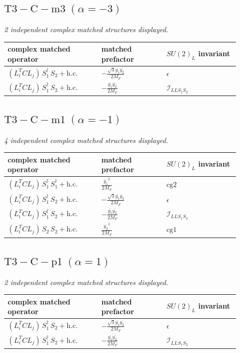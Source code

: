 \documentclass[9pt]{article}
\begin{document}
\subsection*{$ \mathrm{T3-C-m3}\;(\alpha=-3) $}
\textit{2 independent complex matched structures displayed. }
\begin{longtable}{@{}p{0.36\linewidth}p{0.25\linewidth}p{0.29\linewidth}@{}}
\toprule
complex matched operator & matched prefactor & $SU(2)_L$ invariant \\
\midrule
$ (L_i^T C L_j)\,S_1^\dagger\,S_2+\mathrm{h.c.} $ & $ - \frac{\sqrt{3} \overline{y_{1}} \overline{y_{2}}}{2 M_F} $ & $ \epsilon $ \\
$ (L_i^T C L_j)\,S_1^\dagger\,S_2+\mathrm{h.c.} $ & $ - \frac{\overline{y_{1}} \overline{y_{2}}}{2 M_F} $ & $ \mathcal{I}_{LLS_1S_2} $ \\
\bottomrule
\end{longtable}
\subsection*{$ \mathrm{T3-C-m1}\;(\alpha=-1) $}
\textit{4 independent complex matched structures displayed. }
\begin{longtable}{@{}p{0.36\linewidth}p{0.25\linewidth}p{0.29\linewidth}@{}}
\toprule
complex matched operator & matched prefactor & $SU(2)_L$ invariant \\
\midrule
$ (L_i^T C L_j)\,S_1^\dagger\,S_1^\dagger+\mathrm{h.c.} $ & $ \frac{\overline{y_{1}}^{2}}{2 M_F} $ & $ \mathrm{cg2} $ \\
$ (L_i^T C L_j)\,S_1^\dagger\,S_2+\mathrm{h.c.} $ & $ - \frac{\sqrt{3} \overline{y_{1}} \overline{y_{2}}}{2 M_F} $ & $ \epsilon $ \\
$ (L_i^T C L_j)\,S_1^\dagger\,S_2+\mathrm{h.c.} $ & $ - \frac{\overline{y_{1}} \overline{y_{2}}}{2 M_F} $ & $ \mathcal{I}_{LLS_1S_2} $ \\
$ (L_i^T C L_j)\,S_2\,S_2+\mathrm{h.c.} $ & $ \frac{\overline{y_{2}}^{2}}{2 M_F} $ & $ \mathrm{cg1} $ \\
\bottomrule
\end{longtable}
\subsection*{$ \mathrm{T3-C-p1}\;(\alpha=1) $}
\textit{2 independent complex matched structures displayed. }
\begin{longtable}{@{}p{0.36\linewidth}p{0.25\linewidth}p{0.29\linewidth}@{}}
\toprule
complex matched operator & matched prefactor & $SU(2)_L$ invariant \\
\midrule
$ (L_i^T C L_j)\,S_1^\dagger\,S_2+\mathrm{h.c.} $ & $ - \frac{\sqrt{3} \overline{y_{1}} \overline{y_{2}}}{2 M_F} $ & $ \epsilon $ \\
$ (L_i^T C L_j)\,S_1^\dagger\,S_2+\mathrm{h.c.} $ & $ - \frac{\overline{y_{1}} \overline{y_{2}}}{2 M_F} $ & $ \mathcal{I}_{LLS_1S_2} $ \\
\bottomrule
\end{longtable}
\end{document}
